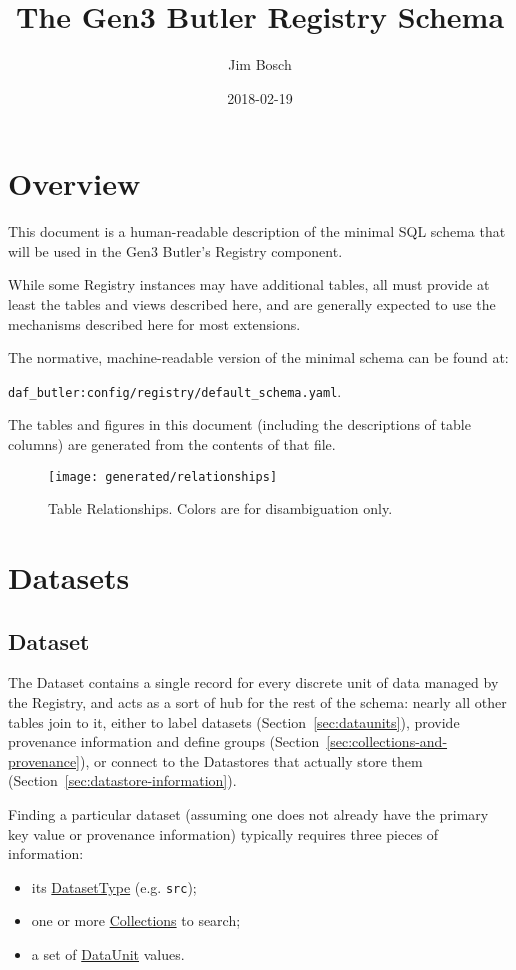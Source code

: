 \documentclass[DM,toc]{lsstdoc}
\title{The Gen3 Butler Registry Schema}
\author{Jim Bosch}
\date{2018-02-19}
\begin{document}
\maketitle

\section{Overview}
\label{sec:overview}

This document is a human-readable description of the minimal SQL schema that will be used in the Gen3 Butler's Registry component.

While some Registry instances may have additional tables, all must provide at least the tables and views described here, and are generally expected to use the mechanisms described here for most extensions.

The normative, machine-readable version of the minimal schema can be found at:

\verb`daf_butler:config/registry/default_schema.yaml`.

The tables and figures in this document (including the descriptions of table columns) are generated from the contents of that file.

\begin{figure}
    \centering
    \texttt{[image: generated/relationships]}
    \caption{Table Relationships.  Colors are for disambiguation only.}
    \label{fig:relationships}
\end{figure}

\section{Datasets}
\label{sec:datasets}

\subsection{Dataset}
\label{sec:dataset}

The Dataset contains a single record for every discrete unit of data managed by the Registry, and acts as a sort of hub for the rest of the schema: nearly all other tables join to it, either to label datasets (Section~\ref{sec:dataunits}), provide provenance information and define groups (Section~\ref{sec:collections-and-provenance}), or connect to the Datastores that actually store them (Section~\ref{sec:datastore-information}).

Finding a particular dataset (assuming one does not already have the primary key value or provenance information) typically requires three pieces of information:
\begin{itemize}
    \item its \hyperref[sec:DatasetType]{DatasetType} (e.g. \texttt{src});
    \item one or more \hyperref[sec:collections]{Collections} to search;
    \item a set of \hyperref[sec:dataunits]{DataUnit} values.
\end{itemize}
\end{document}

